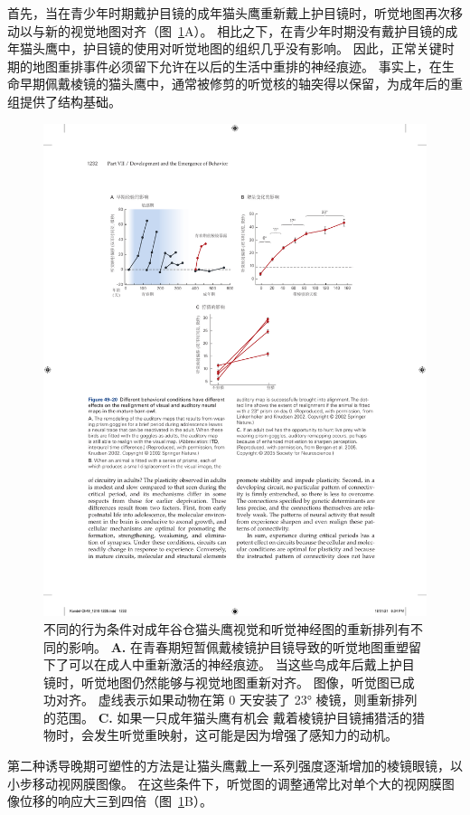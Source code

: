 首先，当在青少年时期戴护目镜的成年猫头鹰重新戴上护目镜时，听觉地图再次移动以与新的视觉地图对齐（图~\ref{fig:49_20}A）。
相比之下，在青少年时期没有戴护目镜的成年猫头鹰中，护目镜的使用对听觉地图的组织几乎没有影响。
因此，正常关键时期的地图重排事件必须留下允许在以后的生活中重排的神经痕迹。
事实上，在生命早期佩戴棱镜的猫头鹰中，通常被修剪的听觉核的轴突得以保留，为成年后的重组提供了结构基础。


\begin{figure}[htbp]
	\centering
	\includegraphics[width=0.8\linewidth]{chap49/fig_49_20}
	\caption{不同的行为条件对成年谷仓猫头鹰视觉和听觉神经图的重新排列有不同的影响。
		\textbf{A.} 在青春期短暂佩戴棱镜护目镜导致的听觉地图重塑留下了可以在成人中重新激活的神经痕迹。
		当这些鸟成年后戴上护目镜时，听觉地图仍然能够与视觉地图重新对齐。
		图像，听觉图已成功对齐。
		虚线表示如果动物在第 0 天安装了 23° 棱镜，则重新排列的范围。
		\textbf{C.} 如果一只成年猫头鹰有机会 戴着棱镜护目镜捕猎活的猎物时，会发生听觉重映射，这可能是因为增强了感知力的动机。}
	\label{fig:49_20}
\end{figure}


第二种诱导晚期可塑性的方法是让猫头鹰戴上一系列强度逐渐增加的棱镜眼镜，以小步移动视网膜图像。
在这些条件下，听觉图的调整通常比对单个大的视网膜图像位移的响应大三到四倍（图~\ref{fig:49_20}B）。


